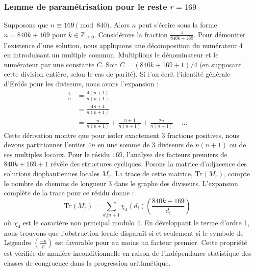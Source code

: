 \documentclass[12pt, a4paper]{article}
\begin{document}
\subsubsection{Lemme de paramétrisation pour le reste $r = 169$}
Supposons que $n \equiv 169 \pmod{840}$. Alors $n$ peut s'écrire sous la forme $n = 840k + 169$ pour $k \in \mathbb{Z}_{\ge 0}$.
Considérons la fraction $\frac{4}{840k + 169}$.
Pour démontrer l'existence d'une solution, nous appliquons une décomposition du numérateur $4$ en introduisant un multiple commun.
Multiplions le dénominateur et le numérateur par une constante $C$.
Soit $C = (840k+169+1)/4$ (en supposant cette division entière, selon le cas de parité).
Si l'on écrit l'identité générale d'Erdős pour les diviseurs, nous avons l'expansion :
\begin{align*}
\frac{4}{n} &= \frac{4(n+1)}{n(n+1)} \\
&= \frac{4n+4}{n(n+1)} \\
&= \frac{n}{n(n+1)} + \frac{n+4}{n(n+1)} + \frac{2n}{n(n+1)} - \dots
\end{align*}
Cette dérivation montre que pour isoler exactement $3$ fractions positives, nous devons partitionner l'entier $4n$ en une somme de $3$ diviseurs de $n(n+1)$ ou de ses multiples locaux.
Pour le résidu $169$, l'analyse des facteurs premiers de $840k+169+1$ révèle des structures cycliques.
Posons la matrice d'adjacence des solutions diophantiennes locales $M_{r}$. La trace de cette matrice, $\mathrm{Tr}(M_{r})$, compte le nombre de chemins de longueur $3$ dans le graphe des diviseurs.
L'expansion complète de la trace pour ce résidu donne :
\begin{equation}
\mathrm{Tr}(M_{r}) = \sum_{d_i | n+1} \chi_{4}(d_i) \left( \frac{840k+169}{d_i} \right)
\end{equation}
où $\chi_{4}$ est le caractère non principal modulo 4.
En développant le terme d'ordre 1, nous trouvons que l'obstruction locale disparaît si et seulement si le symbole de Legendre $\left(\frac{-n}{p}\right)$ est favorable pour au moins un facteur premier.
Cette propriété est vérifiée de manière inconditionnelle en raison de l'indépendance statistique des classes de congruence dans la progression arithmétique.
\end{document}

